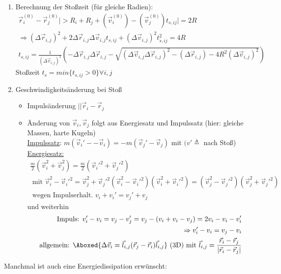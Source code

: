 \documentclass[12pt]{article}
\begin{document}
\begin{enumerate}
\item Berechnung der Stoßzeit (für gleiche Radien): 
\begin{align}
\vec{r}_i^{(0)} - \vec{r}_j^{(0)} \vert > R_i + R_j + \left( \vec{v}_i^{(0)} \right) -\left( \vec{v}_j^{(0)} \right) t_{s,ij}  \vert = 2 R \\
\Rightarrow (\Delta \vec{r}_{i,j})^2 + 2\Delta \vec{r}_{i,j} \Delta\vec{v}_{i,j} t_{s,ij} + (\Delta \vec{v}_{i,j})^2 t_{s,ij}^2 = 4R \\
t_{s,ij} =
 \frac{1}{(\Delta \vec{v}_{i,j})^2} 
 \left( 
 - \Delta \vec{r}_{i,j} \Delta \vec{r}_{i,j} - \sqrt{( \Delta \vec{v}_{i,j} \Delta \vec{r}_{i,j})^2 - (\Delta \vec{r}_{i,j}) - 4R^2 (\Delta \vec{v}_{i,j})^2} \right)
\end{align}
Stoßzeit $t_s = min \{ t_{s,ij} > 0\} \forall i,j$
\item Geschwindigkeitsänderung bei Stoß
\begin{itemize}
\item Impulsänderung $|| \vec{r}_{i} - \vec{r}_{j}$
\item Änderung von $\vec{v}_{i}, \vec{v}_{j}$ folgt aus Energiesatz und Impulssatz (hier: gleiche Massen, harte Kugeln)\\
\underline{Impulssatz}: $m( \vec{v}_{i}' - -\vec{v}_{i}) = -m ( \vec{v}_{j}' - \vec{v}_{j}) $ mit $(v' \triangleq$ nach Stoß) \\
\underline{Energiesatz:}
\begin{align}
\frac{m}{2} (\vec{v}_{i}^2 + \vec{v}_{j}^2) = \frac{m}{2} (\vec{v}_{i}'^2  + \vec{v}_{j}'^2) \\
 \mbox{ mit }  \vec{v}_{i}^2 - \vec{v}_{i}'^2 = \vec{v}_{j}^2 + \vec{v}_{j}'^2 
 (\vec{v}_{i}^2-\vec{v}_{i}'^2)(\vec{v}_{i}^2 + \vec{v}_{i}'^2) = (\vec{v}_{j}^2 - \vec{v}_{j}'^2)(\vec{v}_{j}^2 + \vec{v}_{j}'^2) \\
 \mbox{ wegen Impulserhalt. } v_i + v_i' = v_j' + v_j 
\end{align}
und weiterhin
\begin{align}
\mbox{ Impuls: } v_i'-v_i= v_j -v_j' = v_j - (v_i + v_i - v_j) = 2 v_i - v_i -v_i' \\
\Rightarrow v_i' - v_i = v_j - v_i \\
\mbox{ allgemein: } 
\Aboxed{ \Delta \vec{v}_{i} = \vec{l}_{i,j} (\vec{r}_j - \vec{r}_i)  \vec{l}_{i,j}  }
\mbox{ (3D) mit } \vec{l}_{i,j} = \frac{\vec{r}_i - \vec{r}_j}{\vert \vec{r}_i - \vec{r}_j \vert}
\end{align}
\end{itemize}
\end{enumerate}
 Manchmal ist auch eine Energiedissipation erwünscht: \\
\end{document}
